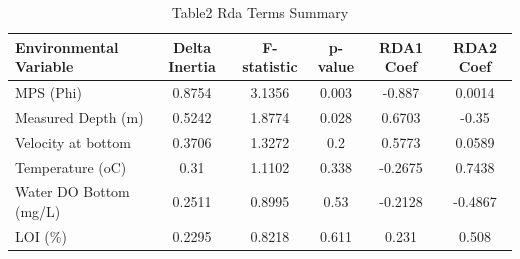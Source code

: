

\begin{table}[htbp]
    \centering
    \small
    \caption{Table2 Rda Terms Summary}
    \label{tab:table2_rda_terms_summary}
    \begin{tabular}{lccccc}
        \toprule
        Environmental Variable & Delta Inertia & F-statistic & p-value & RDA1 Coef & RDA2 Coef \\
        \midrule
        MPS (Phi) & 0.8754 & 3.1356 & 0.003 & -0.887 & 0.0014 \\
        Measured Depth (m) & 0.5242 & 1.8774 & 0.028 & 0.6703 & -0.35 \\
        Velocity  at bottom& 0.3706 & 1.3272 & 0.2 & 0.5773 & 0.0589 \\
        Temperature (oC) & 0.31 & 1.1102 & 0.338 & -0.2675 & 0.7438 \\
        Water DO Bottom (mg/L) & 0.2511 & 0.8995 & 0.53 & -0.2128 & -0.4867 \\
        LOI (\%) & 0.2295 & 0.8218 & 0.611 & 0.231 & 0.508 \\
        \bottomrule
    \end{tabular}
\end{table}
